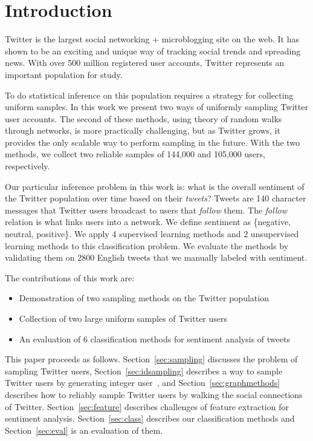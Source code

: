 \section{Introduction}

Twitter is the largest social networking + microblogging site on the web. It has shown to be an exciting and unique way of tracking social trends and spreading news. With over 500 million registered user accounts, Twitter represents an important population for study. 

To do statistical inference on this population requires a strategy for collecting uniform samples. In this work we present two ways of uniformly sampling Twitter user accounts. The second of these methods, using theory of random walks through networks, is more practically challenging, but as Twitter grows, it provides the only scalable way to perform sampling in the future. With the two methods, we collect two reliable samples of 144,000 and 105,000 users, respectively.

Our particular inference problem in this work is: what is the overall sentiment of the Twitter population over time based on their \emph{tweets}? Tweets are 140 character messages that Twitter users broadcast to users that \emph{follow} them. The \emph{follow} relation is what links users into a network. We define sentiment as \{negative, neutral, positive\}. We apply 4 supervised learning methods and 2 unsupervised learning methods to this classification problem. We evaluate the methods by validating them on 2800 English tweets that we manually labeled with sentiment.

The contributions of this work are:
\begin{itemize}
\item Demonstration of two sampling methods on the Twitter population
\item Collection of two large uniform samples of Twitter users
\item An evaluation of 6 classification methods for sentiment analysis of tweets
\end{itemize}

This paper proceeds as follows. Section~\ref{sec:sampling} discusses the problem of sampling Twitter users, Section~\ref{sec:idsampling} describes a way to sample Twitter users by generating integer user~\ids, and Section~\ref{sec:graphmethods} describes how to reliably sample Twitter users by walking the social connections of Twitter. Section~\ref{sec:feature} describes challenges of feature extraction for
sentiment analysis. Section~\ref{sec:class} describes our classification methods and Section~\ref{sec:eval} is an evaluation of them. 
